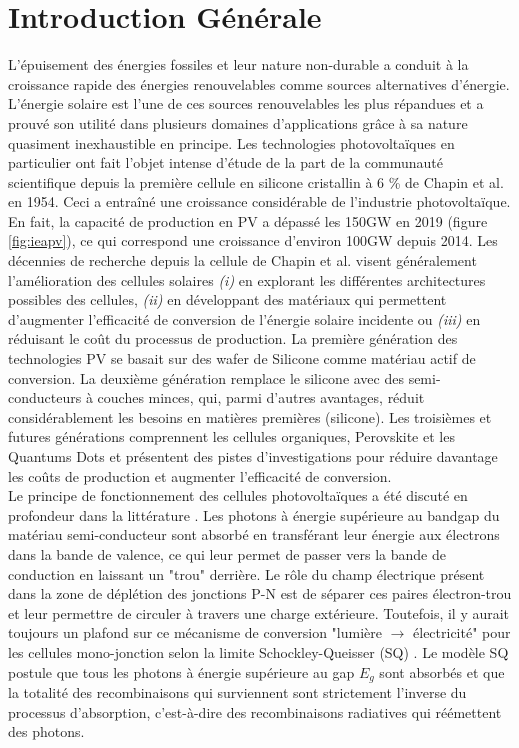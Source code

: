 \chapter*{Introduction Générale}
\label{sec:intro}
L’épuisement des énergies fossiles et leur nature non-durable a conduit à la croissance rapide des énergies renouvelables comme sources alternatives d'énergie. L’énergie solaire est l’une de ces sources renouvelables les plus répandues et a prouvé son utilité dans plusieurs domaines d'applications grâce à sa nature quasiment inexhaustible en principe. Les technologies photovoltaïques en particulier ont fait l'objet intense d'étude de la part de la communauté scientifique depuis la première cellule en silicone cristallin à 6 \% de Chapin et al. \cite{Chapin1954} en 1954. Ceci a entraîné une croissance considérable de l'industrie photovoltaïque. En fait, la capacité de production en PV a dépassé les 150GW \cite{iea2020} en 2019 (figure \ref{fig:ieapv}), ce qui correspond une croissance d'environ 100GW depuis 2014. Les décennies de recherche depuis la cellule de Chapin et al. visent généralement l'amélioration des cellules solaires \textit{(i)} en explorant les différentes architectures possibles des cellules, \textit{(ii)} en développant des matériaux qui permettent d'augmenter l'efficacité de conversion de l'énergie solaire incidente ou \textit{(iii)} en réduisant le coût du processus de production. La première génération des technologies PV se basait sur des wafer de Silicone comme matériau actif de conversion. La deuxième génération remplace le silicone avec des semi-conducteurs à couches minces, qui, parmi d'autres avantages, réduit considérablement les besoins en matières premières (silicone). Les troisièmes et futures générations comprennent les cellules organiques, Perovskite et les Quantums Dots et présentent des pistes d'investigations pour réduire davantage les coûts de production et augmenter l'efficacité de conversion.\\
Le principe de fonctionnement des cellules photovoltaïques a été discuté en profondeur dans la littérature \cite{Fraas2010,  Sze2006, Wenham2013}.
Les photons à énergie supérieure au bandgap du matériau semi-conducteur sont absorbé en transférant leur énergie aux électrons dans la bande de valence, ce qui leur permet de passer vers la bande de conduction en laissant un "trou" derrière. Le rôle du champ électrique présent dans la zone de déplétion des jonctions P-N est de séparer ces paires électron-trou et leur permettre de circuler à travers une charge extérieure. Toutefois, il y aurait toujours un plafond sur ce mécanisme de conversion "lumière $\rightarrow$ électricité" pour les cellules mono-jonction selon la limite Schockley-Queisser (SQ) \cite{Shockley1961}. Le modèle SQ postule que tous les photons à énergie supérieure au gap $E_g$ sont absorbés et que la totalité des recombinaisons qui surviennent sont strictement l'inverse du processus d'absorption, c'est-à-dire des recombinaisons radiatives qui réémettent des photons.\\
